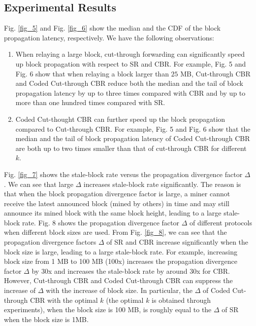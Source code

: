 \documentclass[10pt,journal,compsoc]{IEEEtran}
\begin{document}
\subsection{Experimental Results}
Fig. \ref{fig_5} and Fig. \ref{fig_6} show the median and the CDF of the block propagation latency, respectively. We have the following observations:
\begin{enumerate}
	\item When relaying a large block, cut-through forwarding can significantly speed up block propagation with respect to SR and CBR. For example, Fig. 5 and Fig. 6 show that when relaying a block larger than $25$ MB, Cut-through CBR and Coded Cut-through CBR reduce both the median and the tail of block propagation latency by up to three times compared with CBR and by up to more than one hundred times compared with SR.  
	\item Coded Cut-thought CBR can further speed up the block propagation compared to Cut-through CBR. For example, Fig. 5 and Fig. 6 show that the median and the tail of block propagation latency of Coded Cut-through CBR are both up to two times smaller than that of cut-through CBR for different $k$. 
\end{enumerate}


Fig. \ref{fig_7} shows the stale-block rate versus the propagation divergence factor $\Delta $. We can see that large $\Delta $ increases stale-block rate significantly. The reason is that when the block propagation divergence factor is large, a miner cannot receive the latest announced block (mined by others) in time and may still announce its mined block with the same block height, leading to a large stale-block rate. Fig. 8 shows the propagation divergence factor $\Delta $ of different protocols when different block sizes are used. From Fig. \ref{fig_8}, we can see that the propagation divergence factors $\Delta $ of SR and CBR increase significantly when the block size is large, leading to a large stale-block rate. For example, increasing block size from 1 MB to 100 MB (100x) increases the propagation divergence factor $\Delta $ by 30x and increases the stale-block rate by around 30x for CBR. However, Cut-through CBR and Coded Cut-through CBR can suppress the increase of $\Delta $ with the increase of block size. In particular, the $\Delta $ of Coded Cut-through CBR with the optimal $k$ (the optimal $k$ is obtained through experiments), when the block size is 100 MB, is roughly equal to the $\Delta $ of SR when the block size is 1MB.
\end{document}
